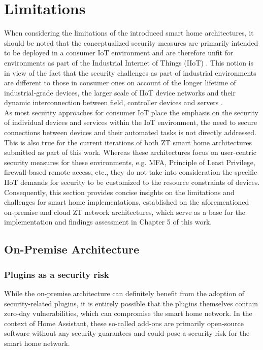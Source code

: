 \section{Limitations}
When considering the limitations of the introduced smart home architectures, it should be noted that the conceptualized security measures are primarily intended to be deployed in a consumer IoT environment and are therefore unfit for environments as part of the Industrial Internet of Things (IIoT) \cite{iiot_article}. This notion is in view of the fact that the security challenges as part of industrial environments are different to those in consumer ones on account of the longer lifetime of industrial-grade devices, the larger scale of IIoT device networks and their dynamic interconnection between field, controller devices and servers \cite{iiot_challenges}.\\
As most security approaches for consumer IoT place the emphasis on the security of individual devices and services within the IoT environment, the need to secure connections between devices and their automated tasks is not directly addressed. This is also true for the current iterations of both ZT smart home architectures submitted as part of this work. Whereas these architectures focus on user-centric security measures for these environments, e.g. MFA, Principle of Least Privilege, firewall-based remote access, etc., they do not take into consideration the specific IIoT demands for security to be customized to the resource constraints of devices. \cite{iiot_challenges}\\
Consequently, this section provides concise insights on the limitations and challenges for smart home implementations, established on the aforementioned on-premise and cloud ZT network architectures, which serve as a base for the implementation and findings assessment in Chapter 5 of this work.

\subsection{On-Premise Architecture}
\subsubsection{Plugins as a security risk}
While the on-premise architecture can definitely benefit from the adoption of security-related plugins, it is entirely possible that the plugins themselves contain zero-day vulnerabilities, which can compromise the smart home network. In the context of Home Assistant, these so-called add-ons are primarily open-source software without any security guarantees and could pose a security risk for the smart home network. 

